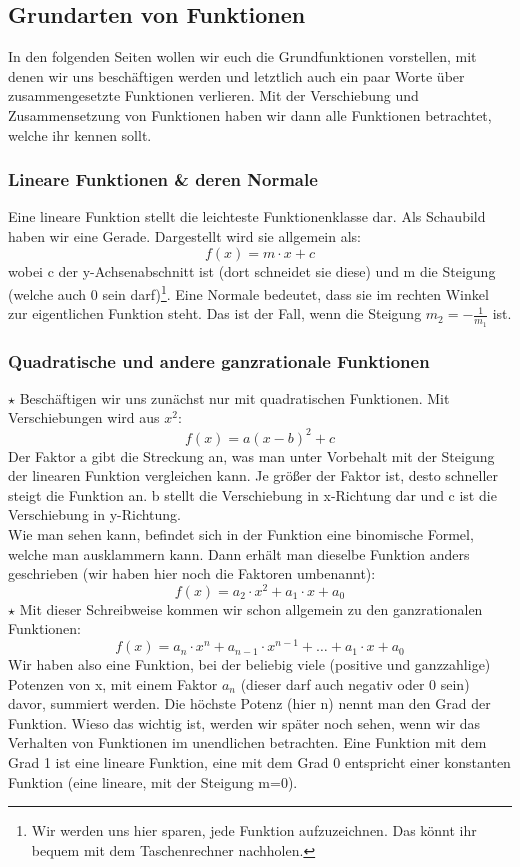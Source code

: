 \subsection{Grundarten von Funktionen}
In den folgenden Seiten wollen wir euch die Grundfunktionen vorstellen, mit denen wir uns beschäftigen werden und letztlich auch ein paar Worte über zusammengesetzte Funktionen verlieren. Mit der Verschiebung und Zusammensetzung von Funktionen haben wir dann alle Funktionen betrachtet, welche ihr kennen sollt.

	\subsubsection{Lineare Funktionen \& deren Normale}
Eine lineare Funktion stellt die leichteste Funktionenklasse dar. Als Schaubild haben wir eine Gerade. Dargestellt wird sie allgemein als:
\[f(x)=m\cdot x+c\]
wobei c der y-Achsenabschnitt ist (dort schneidet sie diese) und m die Steigung (welche auch 0 sein darf)\footnote{Wir werden uns hier sparen, jede Funktion aufzuzeichnen. Das könnt ihr bequem mit dem Taschenrechner nachholen.}. Eine Normale bedeutet, dass sie im rechten Winkel zur eigentlichen Funktion steht. Das ist der Fall, wenn die Steigung \(m_2=-\frac{1}{m_1}\) ist.

	\subsubsection{Quadratische und andere ganzrationale Funktionen}
\(\star\) Beschäftigen wir uns zunächst nur mit quadratischen Funktionen. Mit Verschiebungen wird aus \(x^2\):
\[f(x)=a(x-b)^2+c\]
Der Faktor a gibt die Streckung an, was man unter Vorbehalt mit der Steigung der linearen Funktion vergleichen kann. Je größer der Faktor ist, desto schneller steigt die Funktion an. b  stellt die Verschiebung in x-Richtung dar und c ist die Verschiebung in y-Richtung.\\
Wie man sehen kann, befindet sich in der Funktion eine binomische Formel, welche man ausklammern kann. Dann erhält man dieselbe Funktion anders geschrieben (wir haben hier noch die Faktoren umbenannt):
\[f(x)=a_2 \cdot x^2+a_1 \cdot x+a_0\]
\(\star\) Mit dieser Schreibweise kommen wir schon allgemein zu den ganzrationalen Funktionen:
\[f(x)=a_n \cdot x^n+a_{n-1} \cdot x^{n-1}+\ldots +a_1 \cdot x+a_0\]
Wir haben also eine Funktion, bei der beliebig viele (positive und ganzzahlige) Potenzen von x, mit einem Faktor \(a_n\) (dieser darf auch negativ oder 0 sein) davor, summiert werden. Die höchste Potenz (hier n) nennt man den Grad der Funktion. Wieso das wichtig ist, werden wir später noch sehen, wenn wir das Verhalten von Funktionen im unendlichen betrachten. Eine Funktion mit dem Grad 1 ist eine lineare Funktion, eine mit dem Grad 0 entspricht einer konstanten Funktion (eine lineare, mit der Steigung m=0).


